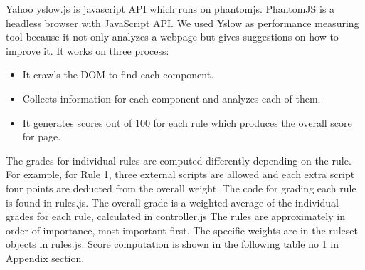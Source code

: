 \documentclass[conference]{IEEEtran}
\begin{document}
Yahoo yslow.js is javascript API which runs on phantomjs. PhantomJS is a
headless browser with JavaScript API. We used Yslow as performance measuring
tool because it not only analyzes a webpage but gives suggestions on how to
improve it.
It works on three process:
\begin{itemize}
\item It crawls the DOM to find each component.
\item Collects information for each component and analyzes each of them.
\item It generates scores out of 100 for each rule which produces the overall
score for page.
\end{itemize}
The grades for individual rules are computed differently depending on the rule.
For example, for Rule 1, three external scripts are allowed and each extra script
four points are deducted from the overall weight. The code for grading each
rule is found in rules.js. The overall grade is a weighted average of the
individual grades for each rule, calculated in controller.js The rules are
approximately in order of importance, most important first. The specific weights
are in the ruleset objects in rules.js. Score computation is shown in
the following table no 1 in Appendix section.
\end{document}
